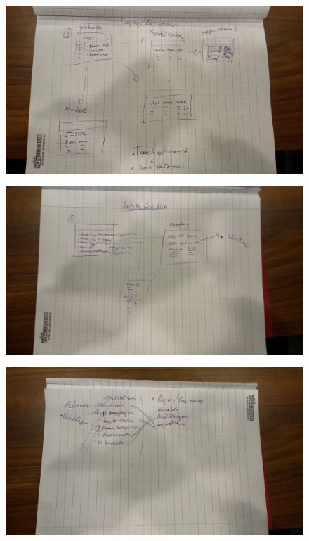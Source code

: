 \documentclass[paper=a4, fontsize=11pt]{report} %
\begin{document}
\begin{itemize}
	\begin{figure}
		\includegraphics[scale=0.12]{artifacts/Lager.jpeg}
		\caption{}
		\label{fig:2}
	\end{figure}

	\begin{figure}
		\includegraphics[scale=0.12]{artifacts/ButiksAdmin.jpeg}
		\caption{}
		\label{fig:3}
	\end{figure}

	\begin{figure}
		\includegraphics[scale=0.12]{artifacts/Admin.jpeg}
		\caption{}
		\label{fig:4}
	\end{figure}


\end{itemize}
\end{document}
